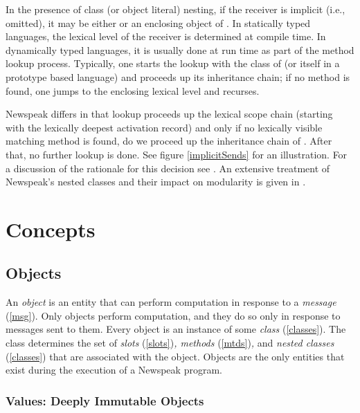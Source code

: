 \documentclass{article}
\begin{document}
 In the presence of class (or object literal)  nesting, if the receiver is implicit (i.e., omitted), it may be either \SELF{} or an enclosing object of \SELF{}.  In statically typed languages, the lexical level of the receiver is determined at compile time. In dynamically typed languages, it is usually done at run time as part of the method lookup process. Typically, one starts the lookup with the class of \SELF{} (or \SELF{} itself in a prototype based language) and proceeds up its inheritance chain; if no method is found, one jumps to the enclosing lexical level and recurses.
 
Newspeak differs in that lookup proceeds up the lexical scope chain (starting with the lexically deepest activation record) and only if no lexically visible matching method is found, do we proceed up the inheritance chain of \SELF{}. After that, no further lookup is done. See figure \ref{implicitSends} for an illustration.
For a discussion of the rationale for this decision see \cite{bracha07b}. An extensive treatment of Newspeak's nested classes and their impact on modularity is given in \cite{bracha10a}.

\section{Concepts}
\label{concept}

\subsection{Objects}
\label{obj}

An {\em object} is an entity that can perform computation in response to a {\em message} (\ref{msg}). Only objects perform computation, and they do so only in response to messages sent to them. Every object is an instance of some {\em class }(\ref{classes}). The class determines the set of {\em slots} (\ref{slots}){\em, methods} (\ref{mtds}){\em,} and {\em nested classes} (\ref{classes}) that are associated with the object. Objects are the only entities that exist during the execution of a Newspeak program. 

\subsubsection{Values: Deeply Immutable Objects}
\label{vals}
\end{document}
